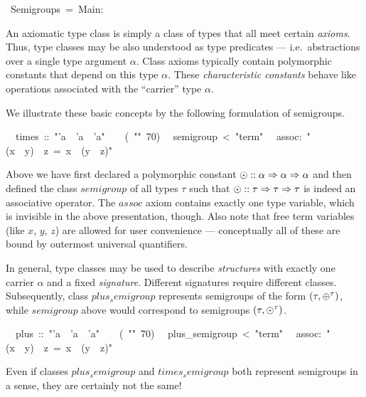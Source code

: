 \begin{isabelle}%
%
~Semigroups~=~Main:%
\begin{isamarkuptext}%
\medskip\noindent An axiomatic type class is simply a class of types
 that all meet certain \emph{axioms}. Thus, type classes may be also
 understood as type predicates --- i.e.\ abstractions over a single
 type argument $\alpha$.  Class axioms typically contain polymorphic
 constants that depend on this type $\alpha$.  These
 \emph{characteristic constants} behave like operations associated
 with the ``carrier'' type $\alpha$.

 We illustrate these basic concepts by the following formulation of
 semigroups.%
\end{isamarkuptext}%
\isanewline
~~times~::~{"}'a~{\isasymRightarrow}~'a~{\isasymRightarrow}~'a{"}~~~~(~{"}{\isasymOtimes}{"}~70)\isanewline
{}\isanewline
~~semigroup~<~{"}term{"}\isanewline
~~assoc:~{"}(x~{\isasymOtimes}~y)~{\isasymOtimes}~z~=~x~{\isasymOtimes}~(y~{\isasymOtimes}~z){"}%
\begin{isamarkuptext}%
\noindent Above we have first declared a polymorphic constant $\odot
 :: \alpha \Rightarrow \alpha \Rightarrow \alpha$ and then defined the class
 $semigroup$ of all types $\tau$ such that $\odot :: \tau \Rightarrow \tau
 \Rightarrow \tau$ is indeed an associative operator.  The $assoc$ axiom
 contains exactly one type variable, which is invisible in the above
 presentation, though.  Also note that free term variables (like $x$,
 $y$, $z$) are allowed for user convenience --- conceptually all of
 these are bound by outermost universal quantifiers.

 \medskip In general, type classes may be used to describe
 \emph{structures} with exactly one carrier $\alpha$ and a fixed
 \emph{signature}.  Different signatures require different classes.
 Subsequently, class $plus_semigroup$ represents semigroups of the
 form $(\tau, \oplus^\tau)$, while $semigroup$ above would correspond
 to semigroups $(\tau, \odot^\tau)$.%
\end{isamarkuptext}%
\isanewline
~~plus~::~{"}'a~{\isasymRightarrow}~'a~{\isasymRightarrow}~'a{"}~~~~(~{"}{\isasymOplus}{"}~70)\isanewline
{}\isanewline
~~plus\_semigroup~<~{"}term{"}\isanewline
~~assoc:~{"}(x~{\isasymOplus}~y)~{\isasymOplus}~z~=~x~{\isasymOplus}~(y~{\isasymOplus}~z){"}%
\begin{isamarkuptext}%
\noindent Even if classes $plus_semigroup$ and $times_semigroup$ both
 represent semigroups in a sense, they are certainly not the same!%
\end{isamarkuptext}%
\end{isabelle}%

